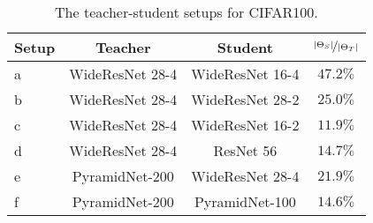\documentclass{article}
\begin{document}
\begin{table}[t]
\begin{center}
\footnotesize 	
\begin{tabular}{|l|c|c|c|}
\hline
Setup & Teacher & Student & $\nicefrac{\vert{\Theta_S}\vert}{\vert{\Theta_T}\vert}$\\
\hline\hline
a & WideResNet 28-4&  WideResNet 16-4 &$47.2\%$\\ 
b & WideResNet 28-4 &WideResNet 28-2 &$25.0\%$\\
c & WideResNet 28-4 & WideResNet 16-2 & $11.9\%$\\
d & WideResNet 28-4 & ResNet 56 &$14.7\%$\\
e & PyramidNet-200 &  WideResNet 28-4 & $21.9\%$\\
f & PyramidNet-200 & PyramidNet-100 & $14.6\%$\\
\hline
\end{tabular}
\end{center}
\caption{The teacher-student setups for CIFAR100.}
\label{tab:cifar100networks}
\end{table}
\end{document}
